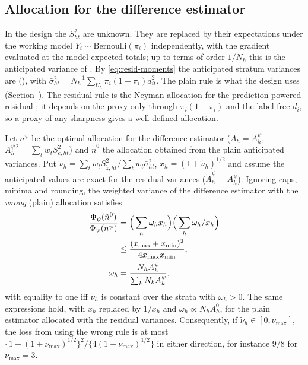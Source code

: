 \subsection{Allocation for the difference estimator}\label{si:theory-alloc}


In the design the $S^2_{ht}$ are unknown. They are replaced by their expectations under the
working model $Y_i\sim\text{Bernoulli}(\pi_i)$ independently, with the gradient evaluated at the
model-expected totals; up to terms of order $1/N_h$ this is the anticipated variance of
\citet{isaki1982}. By \eqref{eq:resid-moments} the anticipated stratum variances are (), with
$\bar\sigma^2_{ht}=N_h^{-1}\sum_{U_h}\pi_i(1-\pi_i)d_{it}^2$. The plain rule is what the design uses (Section~). The residual rule is the Neyman allocation for the prediction-powered residual
\citep{fisch2024stratppi}; it depends on the proxy only through $\pi_i(1-\pi_i)$ and the label-free $d_i$, so a proxy of any
sharpness gives a well-defined allocation.

\begin{proposition}\label{prop:alloc-dif}
Let $n^\psi$ be the optimal allocation for the difference estimator ($A_h=A^\psi_h$, $A^{\psi\,2}_h=\sum_tw_tS^2_{e,ht}$) and $\tilde n^0$ the allocation obtained from the
plain anticipated variances. Put $\tilde\nu_h=\sum_tw_tS^2_{\tilde z,ht}/\sum_tw_t\bar\sigma^2_{ht}$, $x_h=(1+\tilde\nu_h)^{1/2}$ and assume the anticipated values are exact for the
residual variances ($\tilde A^\psi_h=A^\psi_h$). Ignoring caps, minima and rounding, the weighted variance of the difference estimator with the \emph{wrong} (plain) allocation satisfies
\begin{align}
\frac{\Phi_\psi(\tilde n^0)}{\Phi_\psi(n^\psi)}&=\Big(\sum_h\omega_hx_h\Big)\Big(\sum_h\omega_h/x_h\Big)\notag\\
&\le\frac{(x_{\max}+x_{\min})^2}{4x_{\max}x_{\min}},\notag\\
\omega_h&=\frac{N_hA^\psi_h}{\sum_kN_kA^\psi_k},\label{eq:alloc-loss}
\end{align}
with equality to one iff $\tilde\nu_h$ is constant over the strata with $\omega_h>0$. The same expressions hold, with $x_h$ replaced by $1/x_h$ and
$\omega_h\propto N_hA^0_h$, for the plain estimator allocated with the residual variances. Consequently, if $\tilde\nu_h\in[0,\nu_{\max}]$, the loss from
using the wrong rule is at most $\{1+(1+\nu_{\max})^{1/2}\}^2/\{4(1+\nu_{\max})^{1/2}\}$ in either direction, for instance $9/8$ for $\nu_{\max}=3$.
\end{proposition}

